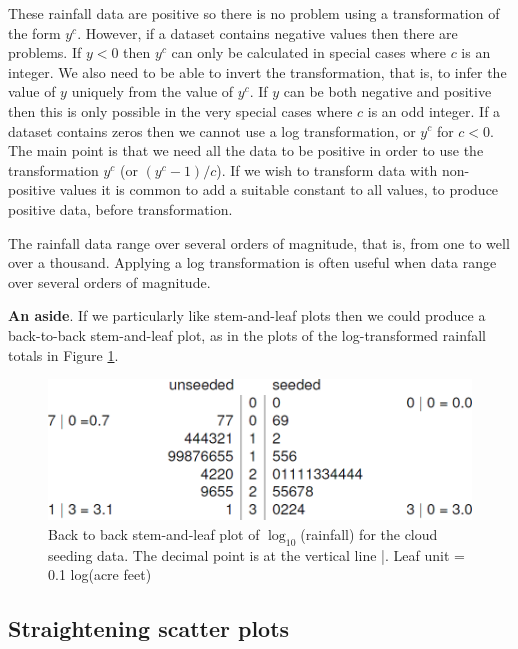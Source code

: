 \documentclass[
  11pt,
  british,
  openany, a4paper]{book}
\begin{document}
These rainfall data are positive so there is no problem using a transformation of the form \(y^c\). However, if a dataset contains negative values then there are problems. If \(y<0\) then \(y^c\) can only be calculated in special cases where \(c\) is an integer. We also need to be able to invert the transformation, that is, to infer the value of \(y\) uniquely from the value of \(y^c\). If \(y\) can be both negative and positive then this is only possible in the very special cases where \(c\) is an odd integer. If a dataset contains zeros then we cannot use a log transformation, or \(y^c\) for \(c < 0\). The main point is that we need all the data to be positive in order to use the transformation \(y^c\) (or \((y^c - 1) / c\)). If we wish to transform data with non-positive values it is common to add a suitable constant to all values, to produce positive data, before transformation.

The rainfall data range over several orders of magnitude, that is, from one to well over a thousand. Applying a log transformation is often useful when data range over several orders of magnitude.

\textbf{An aside}. If we particularly like stem-and-leaf plots then we could produce a back-to-back stem-and-leaf plot, as in the plots of the log-transformed rainfall totals in Figure \ref{fig:cloudstem}.

\begin{figure}

{\centering \includegraphics[width=0.75\linewidth]{images/cloud_stem} 

}

\caption{Back to back stem-and-leaf plot of $\log_{10}$(rainfall) for the cloud seeding data. The decimal point is at the vertical line |. Leaf unit = 0.1 log(acre feet)}\label{fig:cloudstem}
\end{figure}

\hypertarget{straighten}{%
\subsection{Straightening scatter plots}\label{straighten}}
\end{document}
